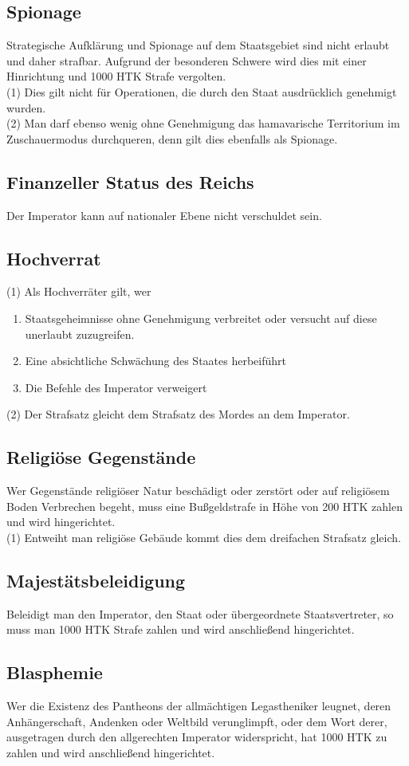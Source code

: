 \documentclass{article}
\begin{document}
\subsection{Spionage}
Strategische Aufklärung und Spionage auf dem Staatsgebiet sind nicht erlaubt und daher strafbar. Aufgrund der besonderen Schwere wird dies mit einer Hinrichtung und 1000 HTK Strafe vergolten.\\
(1) Dies gilt nicht für Operationen, die durch den Staat ausdrücklich genehmigt wurden. \\
(2) Man darf ebenso wenig ohne Genehmigung das hamavarische Territorium im Zuschauermodus durchqueren, denn gilt dies ebenfalls als Spionage.

\subsection{Finanzeller Status des Reichs}
Der Imperator kann auf nationaler Ebene nicht verschuldet sein.

\subsection{Hochverrat}\label{verrat}
(1)	Als Hochverräter gilt, wer
\begin{enumerate}
	\item Staatsgeheimnisse ohne Genehmigung verbreitet oder versucht auf diese unerlaubt zuzugreifen.
	\item Eine absichtliche Schwächung des Staates herbeiführt
	\item Die Befehle des Imperator verweigert
\end{enumerate}
(2)	Der Strafsatz gleicht dem Strafsatz des Mordes an dem Imperator.

\subsection{Religiöse Gegenstände}
Wer Gegenstände religiöser Natur beschädigt oder zerstört oder auf religiösem Boden Verbrechen begeht, muss eine Bußgeldstrafe in Höhe von 200 HTK zahlen und wird hingerichtet.\\
(1) Entweiht man religiöse Gebäude kommt dies dem dreifachen Strafsatz gleich.

\subsection{Majestätsbeleidigung}
Beleidigt man den Imperator, den Staat oder übergeordnete Staatsvertreter, so muss man 1000 HTK Strafe zahlen und wird anschließend hingerichtet.

\subsection{Blasphemie}
Wer die Existenz des Pantheons der allmächtigen Legastheniker leugnet, deren Anhängerschaft, Andenken oder Weltbild verunglimpft, oder dem Wort derer, ausgetragen durch den allgerechten Imperator widerspricht, hat 1000 HTK zu zahlen und wird anschließend hingerichtet.
\end{document}
